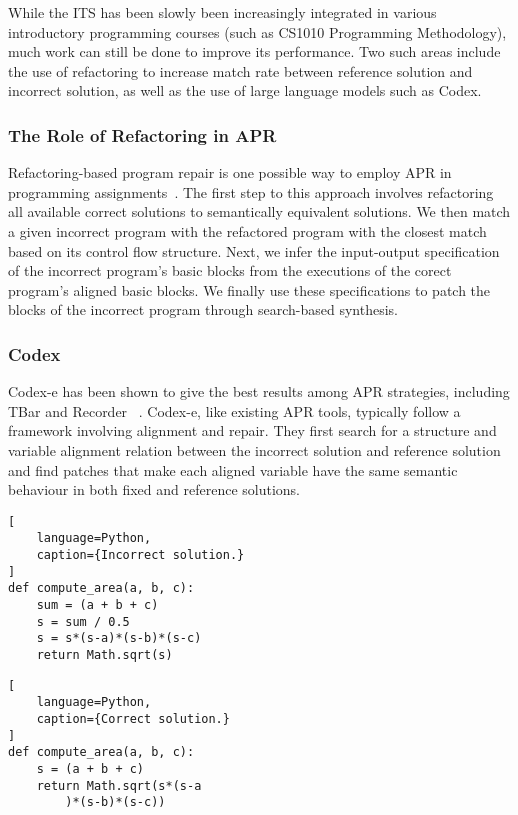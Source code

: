While the ITS has been slowly been increasingly integrated in various introductory
programming courses (such as CS1010 Programming Methodology), much work can still be done
to improve its performance.
Two such areas include the use of refactoring to increase match rate between reference
solution and incorrect solution, as well as the use of large language models such as Codex.

\subsubsection{The Role of Refactoring in APR}

Refactoring-based program repair is one possible way to employ APR in programming
assignments~\cite{hu2019re}.
The first step to this approach involves refactoring all available correct solutions to
semantically equivalent solutions.
We then match a given incorrect program with the refactored program with the closest match
based on its control flow structure.
Next, we infer the input-output specification of the incorrect program's basic blocks
from the executions of the corect program's aligned basic blocks.
We finally use these specifications to patch the blocks of the incorrect program through
search-based synthesis.

\subsubsection{Codex}
\label{background:codex}

Codex-e has been shown to give the best results among APR strategies, including TBar and Recorder
~\cite{fan2022improving}.
Codex-e, like existing APR tools, typically follow a framework involving alignment and repair.
They first search for a structure and variable alignment relation between the incorrect solution
and reference solution and find patches that make each aligned variable have the same semantic
behaviour in both fixed and reference solutions.

\begin{multicols}{2}
\begin{lstlisting}[
    language=Python,
    caption={Incorrect solution.}
]
def compute_area(a, b, c):
    sum = (a + b + c)
    s = sum / 0.5
    s = s*(s-a)*(s-b)*(s-c)
    return Math.sqrt(s)
\end{lstlisting}

\columnbreak

\begin{lstlisting}[
    language=Python,
    caption={Correct solution.}
]
def compute_area(a, b, c):
    s = (a + b + c)
    return Math.sqrt(s*(s-a
        )*(s-b)*(s-c))
\end{lstlisting}
\end{multicols}


